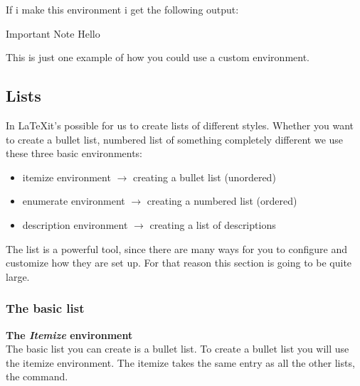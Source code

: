 If i make this environment i get the following output:

\begin{highlightbox}{Important Note}
    Hello
\end{highlightbox}

This is just one example of how you could use a custom environment.

\subsection{Lists}

In \LaTeX it's possible for us to create lists of different styles. Whether you want to create a bullet list, numbered list of something completely different 
we use these three basic environments:

\begin{itemize}
    \item itemize environment $\rightarrow$ creating a bullet list (unordered)
    \item enumerate environment $\rightarrow$ creating a numbered list (ordered)
    \item description environment $\rightarrow$ creating a list of descriptions 
\end{itemize}

The list is a powerful tool, since there are many ways for you to configure and customize how they are
set up. For that reason this section is going to be quite large. 

\subsubsection{The basic list}
\textbf{The \textit{Itemize} environment} \\
The basic list you can create is a bullet list. To create a bullet list you will use the itemize environment.
The itemize takes the same entry as all the other lists, the  command.

